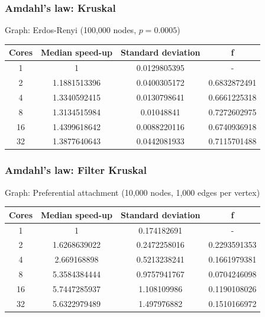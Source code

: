 \documentclass{beamer}
\begin{document}
\begin{frame}

    \frametitle{Amdahl's law: Kruskal}

	Graph: Erdos-Renyi (100,000 nodes, $p=0.0005$)

	\begin{center}
		\begin{tabular}{||c c c c||} 
			\hline
            Cores & Median speed-up & Standard deviation & f \\ [0.5ex] 
			\hline\hline
            1 & 1 & 0.0129805395 & - \\
			\hline
            2 & 1.1881513396 & 0.0400305172 & 0.6832872491 \\
			\hline
            4 & 1.3340592415 & 0.0130798641 & 0.6661225318 \\
			\hline
            8 & 1.3134515984 & 0.01048841 & 0.7272602975 \\
			\hline
            16 & 1.4399618642 & 0.0088220116 & 0.6740936918 \\
			\hline
            32 & 1.3877640643 & 0.0442081933 & 0.7115701488 \\ [1ex] 
			\hline
		\end{tabular}
	\end{center}

\end{frame}

\begin{frame}

    \frametitle{Amdahl's law: Filter Kruskal}

	Graph: Preferential attachment (10,000 nodes, 1,000 edges per vertex)

	\begin{center}
		\begin{tabular}{||c c c c||} 
			\hline
            Cores & Median speed-up & Standard deviation & f \\ [0.5ex] 
			\hline\hline
			1 & 1 & 0.174182691 & - \\
			\hline
			2 & 1.6268639022 & 0.2472258016 & 0.2293591353 \\
			\hline
			4 & 2.669168898	& 0.5213238241 & 0.1661979381 \\
			\hline
			8 & 5.3584384444 & 0.9757941767 & 0.0704246098 \\
			\hline
			16 & 5.7447285937 & 1.108109986 & 0.1190108026 \\
			\hline
			32 & 5.6322979489 & 1.497976882 & 0.1510166972 \\ [1ex] 
			\hline
		\end{tabular}
	\end{center}

\end{frame}
\end{document}
